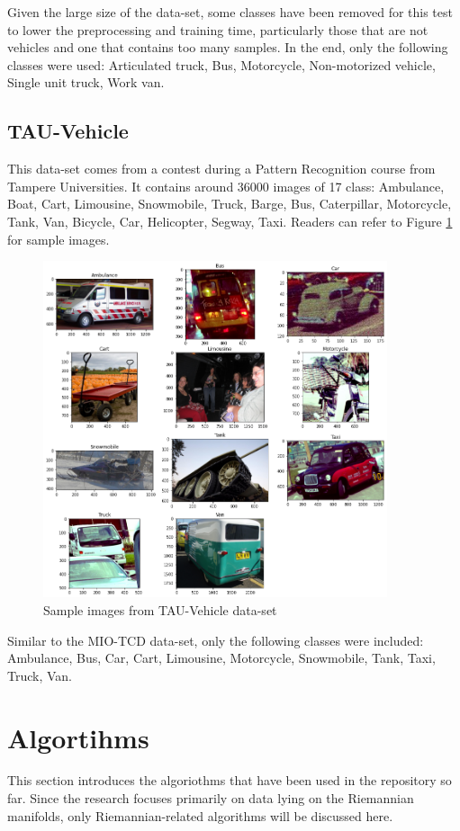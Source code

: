 \documentclass[12pt]{article}
\begin{document}
\begin{sloppypar}
\noindent
Given the large size of the data-set, some classes have been removed for this test to lower the preprocessing and training time, particularly those that are not vehicles and one that contains too many samples. In the end, only the following classes were used: Articulated truck, Bus, Motorcycle, Non-motorized vehicle, Single unit truck, Work van.

\subsection{TAU-Vehicle}
This data-set comes from a contest during a Pattern Recognition course from Tampere Universities. It contains around 36000 images of 17 class: Ambulance, Boat, Cart, Limousine, Snowmobile, Truck, Barge, Bus, Caterpillar, Motorcycle, Tank, Van, Bicycle, Car, Helicopter, Segway, Taxi. Readers can refer to Figure \ref{img:TAU-images} for sample images.

\begin{figure}[h]
\caption{Sample images from TAU-Vehicle data-set}
\label{img:TAU-images}
\centering
\includegraphics[width=0.9\textwidth]{TAU_images.png}
\end{figure}

\noindent
Similar to the MIO-TCD data-set, only the following classes were included: Ambulance, Bus, Car, Cart, Limousine, Motorcycle, Snowmobile, Tank, Taxi, Truck, Van.


\section{Algortihms}
This section introduces the algoriothms that have been used in the repository so far. Since the research focuses primarily on data lying on the Riemannian manifolds, only Riemannian-related algorithms will be discussed here.


\end{sloppypar}
\end{document}
